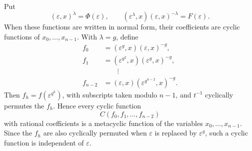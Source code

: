 \documentclass[11pt]{article}
\newcommand{\eps}{\varepsilon}
\begin{document}
Put
\begin{equation}
  (\eps,x)^\lambda=\Phi(\eps),\qquad
  (\eps^\lambda,x)(\eps,x)^{-\lambda}=F(\eps).
\end{equation}
When these functions are written in normal form, their coefficients are cyclic functions of $x_0,
\ldots,x_{n-1}$. With $\lambda=g$, define
\begin{equation}
\begin{aligned}
 f_0&=(\eps^g,x)(\eps,x)^{-g},\\
 f_1&=(\eps^{g^2},x)(\eps^g,x)^{-g},\\
 &\hspace{2em}\vdots\\
 f_{n-2}&=(\eps,x)(\eps^{g^{n-2}},x)^{-g}.
\end{aligned}
\end{equation}
Then $f_h=f(\eps^{g^h})$, with subscripts taken modulo $n-1$, and $t^{-1}$ cyclically permutes the $f_h$. Hence every cyclic function
\begin{equation}
  C(f_0,f_1,\ldots,f_{n-2})
\end{equation}
with rational coefficients is a metacyclic function of the variables $x_0,
\ldots,x_{n-1}$. Since the $f_h$ are also cyclically permuted when $\eps$ is replaced by $\eps^g$, such a cyclic function is independent of $\eps$.
\end{document}
